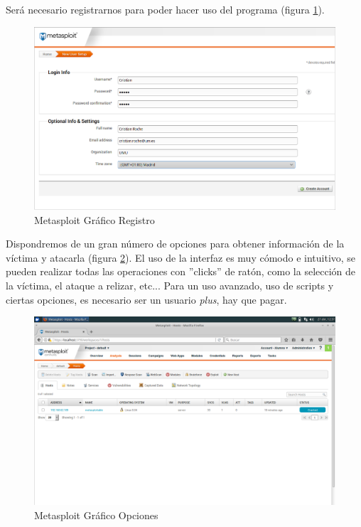 \documentclass[a4,12pt,onecolum]{article}
\begin{document}
Será necesario registrarnos para poder hacer uso del programa (figura \ref{fig:graf2}). \\

\begin{figure}[htbp]
\centering
\includegraphics[width=1.0\textwidth]{./images/interfaz_metasploit/grafico_registro.png}
\caption{Metasploit Gráfico Registro}
\label{fig:graf2}
\end{figure}

Dispondremos de un gran número de opciones para obtener información de la víctima y atacarla (figura \ref{fig:graf3}). El uso de la interfaz es muy cómodo e intuitivo, se pueden realizar todas las operaciones con ''clicks'' de ratón, como la selección de la víctima, el ataque a relizar, etc... Para un uso avanzado, uso de scripts y ciertas opciones, es necesario ser un usuario \emph{plus}, hay que pagar.

\begin{figure}[htbp]
\centering
\includegraphics[width=1.0\textwidth]{./images/interfaz_metasploit/grafico_opciones.png}
\caption{Metasploit Gráfico Opciones}
\label{fig:graf3}
\end{figure}
\end{document}
